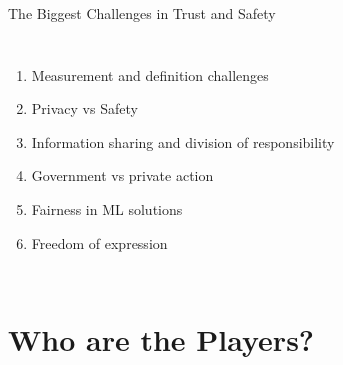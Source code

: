 \documentclass[nobackground,dvipsnames,table]{beamer}
\begin{document}
\begin{frame}{The Biggest Challenges in Trust and Safety}
\begin{columns}
\begin{enumerate}
                    \item Measurement and definition challenges
                    \item Privacy vs Safety
                    \item Information sharing and division of responsibility
                    \item Government vs private action
                    \item Fairness in ML solutions
                    \item Freedom of expression
                \end{enumerate}
        \end{columns}
\end{frame}

\section{Who are the Players?}
\end{document}
